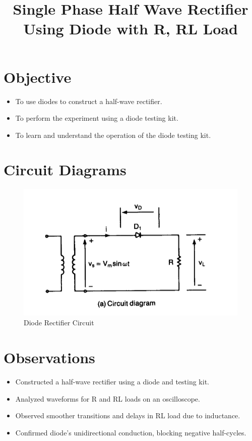 \documentclass[12pt]{article}
\title{Single Phase Half Wave Rectifier Using Diode with R, RL Load}
\author{}
\date{}
\begin{document}
% 

\pagebreak


\pagebreak
{}
\maketitle

\section*{Objective}
\begin{itemize}
    \item To use diodes to construct a half-wave rectifier.
    \item To perform the experiment using a diode testing kit.
    \item To learn and understand the operation of the diode testing kit.
\end{itemize}

\section*{Circuit Diagrams}
\begin{figure}[H]
    \centering
    \includegraphics[width=.7\textwidth]{half_ckt.png}
    \caption{Diode Rectifier Circuit \cite{rashid2013power}}
    \label{fig:dc_r_load}
\end{figure}

\section*{Observations}
\begin{itemize}
    \item Constructed a half-wave rectifier using a diode and testing kit.
    \item Analyzed waveforms for R and RL loads on an oscilloscope.
    \item Observed smoother transitions and delays in RL load due to inductance.
    \item Confirmed diode's unidirectional conduction, blocking negative half-cycles.
\end{itemize}
\end{document}
